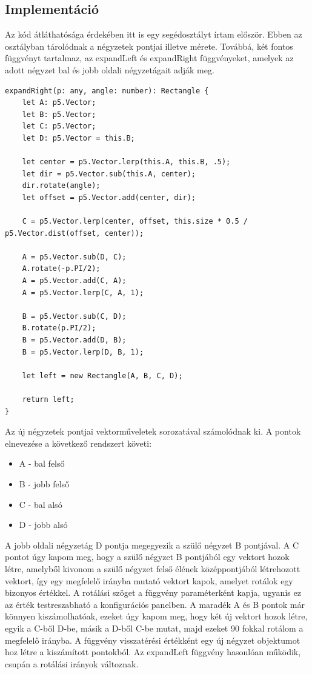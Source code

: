 \subsection*{Implementáció}
Az kód átláthatósága érdekében itt is egy segédosztályt írtam először. Ebben az osztályban tárolódnak a négyzetek pontjai illetve mérete. Továbbá, két fontos függvényt tartalmaz, az expandLeft és expandRight függvényeket, amelyek az adott négyzet bal és jobb oldali négyzetágait adják meg. 
\begin{lstlisting}
expandRight(p: any, angle: number): Rectangle {
	let A: p5.Vector;
	let B: p5.Vector;
	let C: p5.Vector;
	let D: p5.Vector = this.B;
	
	let center = p5.Vector.lerp(this.A, this.B, .5);
	let dir = p5.Vector.sub(this.A, center);
	dir.rotate(angle);
	let offset = p5.Vector.add(center, dir);
	
	C = p5.Vector.lerp(center, offset, this.size * 0.5 / p5.Vector.dist(offset, center));
	
	A = p5.Vector.sub(D, C);
	A.rotate(-p.PI/2);
	A = p5.Vector.add(C, A);
	A = p5.Vector.lerp(C, A, 1);
	
	B = p5.Vector.sub(C, D);
	B.rotate(p.PI/2);
	B = p5.Vector.add(D, B);
	B = p5.Vector.lerp(D, B, 1);
	
	let left = new Rectangle(A, B, C, D);
	
	return left;
}
\end{lstlisting}
Az új négyzetek pontjai vektorműveletek sorozatával számolódnak ki. A pontok elnevezése a következő rendszert követi: 
\begin{itemize}
	\item A - bal felső
	\item B - jobb felső
	\item C - bal alsó
	\item D - jobb alsó
\end{itemize}
A jobb oldali négyzetág D pontja megegyezik a szülő négyzet B pontjával. A C pontot úgy kapom meg, hogy a szülő négyzet B pontjából egy vektort hozok létre, amelyből kivonom a szülő négyzet felső élének középpontjából létrehozott vektort, így egy megfelelő irányba mutató vektort kapok, amelyet rotálok egy bizonyos értékkel. A rotálási szöget a függvény paraméterként kapja, ugyanis ez az érték testreszabható a konfigurációs panelben. A maradék A és B pontok már könnyen kiszámolhatóak, ezeket úgy kapom meg, hogy két új vektort hozok létre, egyik a C-ből D-be, másik a D-ből C-be mutat, majd ezeket 90 fokkal rotálom a megfelelő irányba. A függvény visszatérési értékként egy új négyzet objektumot hoz létre a kiszámított pontokból. Az expandLeft függvény hasonlóan működik, csupán a rotálási irányok változnak. 
